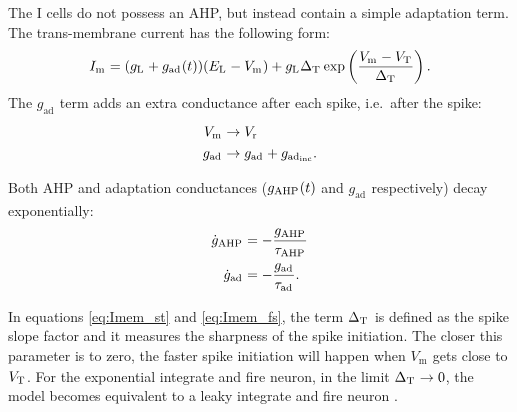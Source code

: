 \documentclass[a4paper,12pt]{article}
\newcommand{\ssc}[3]{\ensuremath{#1_{\text{#2}_{\text{#3}}}}}
\newcommand{\Vm}       {\ssc{V}      {m}     {}}
\newcommand{\Imem}     {\ssc{I}      {m}     {}}
\newcommand{\gL}       {\ssc{g}      {\scriptsize{L}}  {}}
\newcommand{\EL}       {\ssc{E}      {\scriptsize{L}}  {}}
\newcommand{\gAHP}     {\ssc{g}      {\scriptsize{AHP}}{}}
\newcommand{\tauAHP}   {\ssc{\tau}   {\scriptsize{AHP}}{}}
\newcommand{\VT}       {\ssc{V}      {\scriptsize{T}}  {}}
\newcommand{\Vr}       {\ssc{V}      {r}     {}}
\newcommand{\gad}      {\ssc{g}      {ad}{}}
\newcommand{\tauad}    {\ssc{\tau}   {ad}{}}
\newcommand{\gadinc}   {\ssc{g}      {ad}{inc}}
\newcommand{\deltaT}   {\ssc{\Delta} {\scriptsize{T}}{}}
\newcommand{\dgAHP}  {\ssc{\dot{g}}{\scriptsize{AHP}} {}}
\newcommand{\dgad}   {\ssc{\dot{g}}{\scriptsize{ad}}  {}}
\begin{document}
The I cells do not possess an AHP, but instead contain a simple adaptation
term. The trans-membrane current has the following form:
\begin{equation}
    \Imem = (\gL + \gad(t))(\EL-\Vm) + \gL \deltaT \exp\left(\frac{\Vm - \VT}{\deltaT}\right).
    \label{eq:Imem_fs}
\end{equation}
The $\gad$ term adds an extra conductance after each spike, i.e.\ after the
spike:
\begin{align}
    \Vm   & \rightarrow \Vr       \notag \\
    \gad  & \rightarrow \gad + \gadinc.
    \label{eq:afterspike_fs}
\end{align}

Both AHP and adaptation conductances ($\gAHP(t)$ and $\gad$ respectively) decay
exponentially:
\begin{align}
    \dgAHP   &=  -\frac{\gAHP}{\tauAHP} \notag \\
    \dgad    &=  -\frac{\gad }{\tauad}.
    \label{eq:dgAHPad}
\end{align}

In equations \eqref{eq:Imem_st} and \eqref{eq:Imem_fs}, the term $\deltaT$ is
defined as the spike slope factor \citep{FourcaudTrocme:2003wz} and it measures
the sharpness of the spike initiation. The closer this parameter is to
zero, the faster spike initiation will happen when $\Vm$ gets close to $\VT$.
For the exponential integrate and fire neuron, in the limit $\deltaT
\rightarrow 0$, the model becomes equivalent to a leaky integrate and fire
neuron \citep{FourcaudTrocme:2003wz}.
\end{document}
